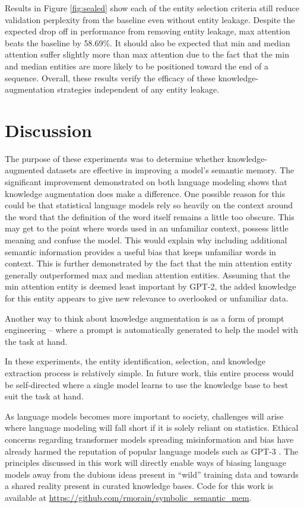 \documentclass[phd,electronic,oneside,twosidetoc,letterpaper,chaptercenter,parttop,lof]{byumsphd}
\begin{document}
Results in Figure \ref{fig:sealed} show each of the entity selection criteria still reduce validation perplexity from the baseline even without entity leakage.
Despite the expected drop off in performance from removing entity leakage, max attention beats the baseline by 58.69\%.
It should also be expected that min and median attention suffer slightly more than max attention due to the fact that the min and median entities are more likely to be positioned toward the end of a sequence.
Overall, these results verify the efficacy of these knowledge-augmentation strategies independent of any entity leakage. 



        
\section{Discussion}

The purpose of these experiments was to determine whether knowledge-augmented datasets are effective in improving a model's semantic memory.
The significant improvement demonstrated on both language modeling shows that knowledge augmentation does make a difference.
One possible reason for this could be that statistical language models rely so heavily on the context around the word that the definition of the word itself remains a little too obscure.
This may get to the point where words used in an unfamiliar context, possess little meaning and confuse the model.
This would explain why including additional semantic information provides a useful bias that keeps unfamiliar words in context.
This is further demonstrated by the fact that the min attention entity generally outperformed max and median attention entities.
Assuming that the min attention entity is deemed least important by GPT-2, the added knowledge for this entity appears to give new relevance to overlooked or unfamiliar data.

Another way to think about knowledge augmentation is as a form of prompt engineering -- where a prompt is automatically generated to help the model with the task at hand.

In these experiments, the entity identification, selection, and knowledge extraction process is relatively simple.
In future work, this entire process would be self-directed where a single model learns to use the knowledge base to best suit the task at hand. 


As language models becomes more important to society, challenges will arise where language modeling will fall short if it is solely reliant on statistics.
Ethical concerns regarding transformer models spreading misinformation and bias have already harmed the reputation of popular language models such as GPT-3 \cite{bender2021dangers}.
The principles discussed in this work will directly enable ways of biasing language models away from the dubious ideas present in ``wild'' training data and towards a shared reality present in curated knowledge bases.
Code for this work is available at \url{https://github.com/rmorain/symbolic_semantic_mem}.
\end{document}
